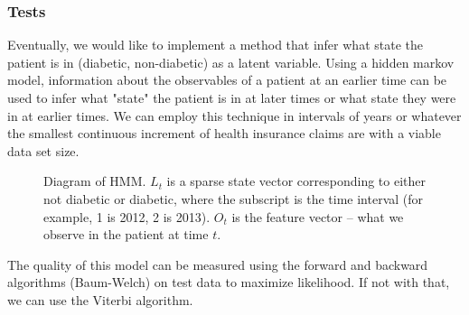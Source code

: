 \documentclass{article}
\begin{document}
\subsubsection{Tests}

Eventually, we would like to implement a method that infer what state the patient is in (diabetic, non-diabetic) as a latent variable. Using a hidden markov model, information about the observables of a patient at an earlier time can be used to infer what "state" the patient is in at later times or what state they were in at earlier times. We can employ this technique in intervals of years or whatever the smallest continuous increment of health insurance claims are with a viable data set size.
\begin{figure}
\caption{Diagram of HMM. $\mathit{L}_t$ is a sparse state vector corresponding to either not diabetic or diabetic, where the subscript is the time interval (for example, 1 is 2012, 2 is 2013). $\mathit{O}_t$ is the feature vector -- what we observe in the patient at time $t$. }
\end{figure}

The quality of this model can be measured using the forward and backward algorithms (Baum-Welch) on test data to maximize likelihood. If not with that, we can use the Viterbi algorithm.
\end{document}
